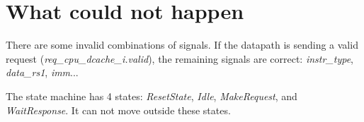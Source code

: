 \section{What could not happen}

There are some invalid combinations of signals.
If the datapath is sending a valid request (\textit{req\_cpu\_dcache\_i.valid}), the remaining signals are correct: \textit{instr\_type}, \textit{data\_rs1}, \textit{imm}...

The state machine has 4 states: \textit{ResetState}, \textit{Idle}, \textit{MakeRequest}, and \textit{WaitResponse}.
It can not move outside these states.
